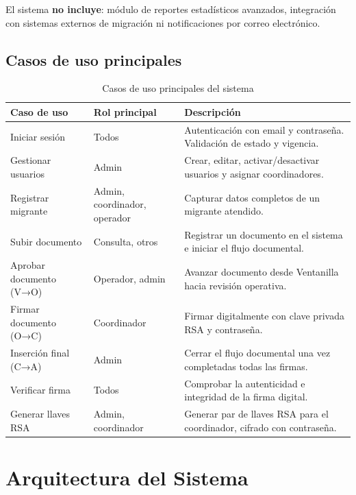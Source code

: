 \documentclass[10pt,letterpaper]{report}
\begin{document}
El sistema \textbf{no incluye}: módulo de reportes estadísticos avanzados, integración con sistemas externos de migración ni notificaciones por correo electrónico.

\section{Casos de uso principales}

\begin{table}[H]
\centering
\caption{Casos de uso principales del sistema}
\label{tab:casos-uso}
\begin{tabular}{p{} p{} p{}}
\toprule
\textbf{Caso de uso} & \textbf{Rol principal} & \textbf{Descripción} \\
\midrule
Iniciar sesión & Todos & Autenticación con email y contraseña. Validación de estado y vigencia. \\
Gestionar usuarios & Admin & Crear, editar, activar/desactivar usuarios y asignar coordinadores. \\
Registrar migrante & Admin, coordinador, operador & Capturar datos completos de un migrante atendido. \\
Subir documento & Consulta, otros & Registrar un documento en el sistema e iniciar el flujo documental. \\
Aprobar documento (V→O) & Operador, admin & Avanzar documento desde Ventanilla hacia revisión operativa. \\
Firmar documento (O→C) & Coordinador & Firmar digitalmente con clave privada RSA y contraseña. \\
Inserción final (C→A) & Admin & Cerrar el flujo documental una vez completadas todas las firmas. \\
Verificar firma & Todos & Comprobar la autenticidad e integridad de la firma digital. \\
Generar llaves RSA & Admin, coordinador & Generar par de llaves RSA para el coordinador, cifrado con contraseña. \\
\bottomrule
\end{tabular}
\end{table}

\chapter{Arquitectura del Sistema}
\end{document}
